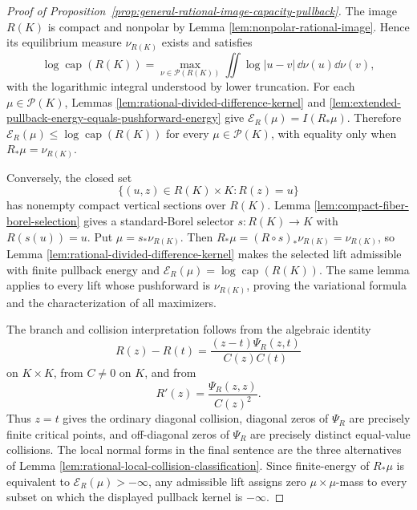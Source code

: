 \begin{proof}[Proof of Proposition~\ref{prop:general-rational-image-capacity-pullback}]
The image \(R(K)\) is compact and nonpolar by Lemma \ref{lem:nonpolar-rational-image}.  Hence its equilibrium measure \(\nu_{R(K)}\) exists and satisfies
\[
\log\operatorname{cap}(R(K))
=\max_{\nu\in\mathcal P(R(K))}\iint\log|u-v|\,\dd\nu(u)\dd\nu(v),
\]
with the logarithmic integral understood by lower truncation.  For each \(\mu\in\mathcal P(K)\), Lemmas \ref{lem:rational-divided-difference-kernel} and \ref{lem:extended-pullback-energy-equals-pushforward-energy} give \(\mathcal E_R(\mu)=I(R_\ast\mu)\).  Therefore \(\mathcal E_R(\mu)\le\log\operatorname{cap}(R(K))\) for every \(\mu\in\mathcal P(K)\), with equality only when \(R_\ast\mu=\nu_{R(K)}\).

Conversely, the closed set
\[
\{(u,z)\in R(K)\times K:R(z)=u\}
\]
has nonempty compact vertical sections over \(R(K)\).  Lemma \ref{lem:compact-fiber-borel-selection} gives a standard-Borel selector \(s:R(K)\to K\) with \(R(s(u))=u\).  Put \(\mu=s_\ast\nu_{R(K)}\).  Then \(R_\ast\mu=(R\circ s)_\ast\nu_{R(K)}=\nu_{R(K)}\), so Lemma \ref{lem:rational-divided-difference-kernel} makes the selected lift admissible with finite pullback energy and \(\mathcal E_R(\mu)=\log\operatorname{cap}(R(K))\).  The same lemma applies to every lift whose pushforward is \(\nu_{R(K)}\), proving the variational formula and the characterization of all maximizers.

The branch and collision interpretation follows from the algebraic identity
\[
R(z)-R(t)=\frac{(z-t)\Psi_R(z,t)}{C(z)C(t)}
\]
on \(K\times K\), from \(C\ne0\) on \(K\), and from
\[
R'(z)=\frac{\Psi_R(z,z)}{C(z)^2}.
\]
Thus \(z=t\) gives the ordinary diagonal collision, diagonal zeros of \(\Psi_R\) are precisely finite critical points, and off-diagonal zeros of \(\Psi_R\) are precisely distinct equal-value collisions.  The local normal forms in the final sentence are the three alternatives of Lemma \ref{lem:rational-local-collision-classification}.  Since finite-energy of \(R_\ast\mu\) is equivalent to \(\mathcal E_R(\mu)>-\infty\), any admissible lift assigns zero \(\mu\times\mu\)-mass to every subset on which the displayed pullback kernel is \(-\infty\).
\end{proof}

